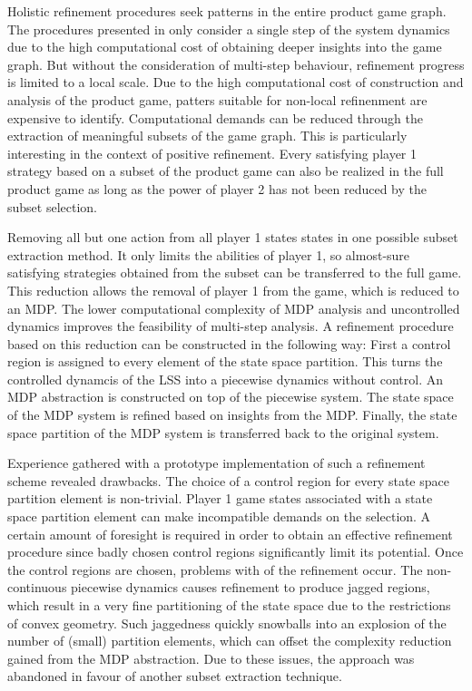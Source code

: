 Holistic refinement procedures seek patterns in the entire product game graph.
The procedures presented in  only consider a single step of the system dynamics due to the high computational cost of obtaining deeper insights into the game graph.
But without the consideration of multi-step behaviour, refinement progress is limited to a local scale.
Due to the high computational cost of construction and analysis of the product game, patters suitable for non-local refinenment are expensive to identify.
Computational demands can be reduced through the extraction of meaningful subsets of the game graph.
This is particularly interesting in the context of positive refinement.
Every satisfying player 1 strategy based on a subset of the product game can also be realized in the full product game as long as the power of player 2 has not been reduced by the subset selection.

Removing all but one action from all player 1 states states in one possible subset extraction method.
It only limits the abilities of player 1, so almost-sure satisfying strategies obtained from the subset can be transferred to the full game.
This reduction allows the removal of player 1 from the game, which is reduced to an MDP.
The lower computational complexity of MDP analysis and uncontrolled dynamics improves the feasibility of multi-step analysis.
A refinement procedure based on this reduction can be constructed in the following way:
First a control region is assigned to every element of the state space partition.
This turns the controlled dynamcis of the LSS into a piecewise dynamics without control.
An MDP abstraction is constructed on top of the piecewise system.
The state space of the MDP system is refined based on insights from the MDP.
Finally, the state space partition of the MDP system is transferred back to the original system.

Experience gathered with a prototype implementation of such a refinement scheme revealed drawbacks.
The choice of a control region for every state space partition element is non-trivial.
Player 1 game states associated with a state space partition element can make incompatible demands on the selection.
A certain amount of foresight is required in order to obtain an effective refinement procedure since badly chosen control regions significantly limit its potential.
Once the control regions are chosen, problems with  of the refinement occur.
The non-continuous piecewise dynamics causes refinement to produce jagged regions, which result in a very fine partitioning of the state space due to the restrictions of convex geometry.
Such jaggedness quickly snowballs into an explosion of the number of (small) partition elements, which can offset the complexity reduction gained from the MDP abstraction.
Due to these issues, the approach was abandoned in favour of another subset extraction technique.

